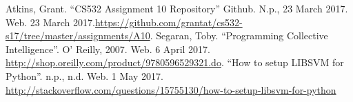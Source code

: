 \documentclass[letterpaper,11pt]{article}
\newcommand*{\srcPath}{../src}%
\begin{document}




\clearpage


\clearpage



\begin{thebibliography}{9}
Atkins, Grant. ``CS532 Assignment 10 Repository'' Github. N.p., 23 March 2017. Web. 23 March 2017.\url{https://github.com/grantat/cs532-s17/tree/master/assignments/A10}.
Segaran, Toby. ``Programming Collective Intelligence''. O' Reilly, 2007. Web. 6 April 2017. \url{http://shop.oreilly.com/product/9780596529321.do}.
``How to setup LIBSVM for Python''. n.p., n.d. Web. 1 May 2017. \url{http://stackoverflow.com/questions/15755130/how-to-setup-libsvm-for-python}
\end{thebibliography}
\end{document}
